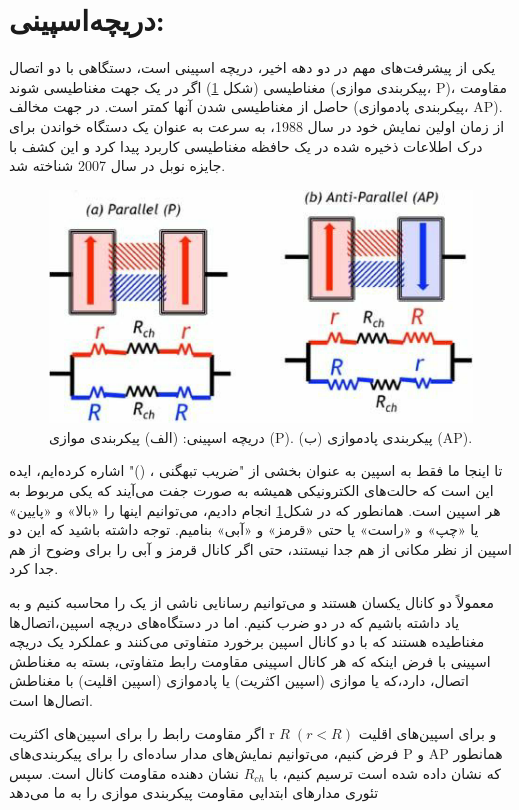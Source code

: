 \section{دریچه‌اسپینی:}
یکی از پیشرفت‌های مهم در دو دهه اخیر، دریچه اسپینی  است، دستگاهی با دو اتصال مغناطیسی (شکل \ref{fig:spinvalve}) اگر در یک جهت مغناطیسی شوند (پیکربندی موازی، \gls{P})، مقاومت حاصل از مغناطیسی شدن آنها کمتر است. در جهت مخالف (پیکربندی پاد‌موازی، \gls{AP}). از زمان اولین نمایش خود در سال 1988، به سرعت به عنوان یک دستگاه خواندن برای درک اطلاعات ذخیره شده در یک حافظه مغناطیسی کاربرد پیدا کرد و این کشف با جایزه نوبل در سال 2007 شناخته شد.
\begin{figure}[!ht]
  \includegraphics[width=1\linewidth]{./figures/spinvalve.png}
  \caption{دریچه اسپینی: (الف) پیکربندی موازی (P). (ب) پیکربندی پاد‌موازی (AP).}
  \label{fig:spinvalve}
\end{figure}
تا اینجا ما فقط به اسپین به عنوان بخشی از "ضریب تبهگنی ، ()" اشاره کرده‌ایم، ایده این است که حالت‌های الکترونیکی همیشه به صورت جفت ‌می‌‌آیند که یکی مربوط به هر اسپین است. همانطور که در شکل\ref{fig:spinvalve} انجام دادیم، ‌می‌‌توانیم اینها را «بالا» و «پایین» یا «چپ» و «راست» یا حتی «قرمز» و «آبی» بنا‌میم. توجه داشته باشید که این دو اسپین از نظر مکانی از هم جدا نیستند، حتی اگر کانال قرمز و آبی را برای وضوح از هم جدا کرد.

معمولاً دو کانال یکسان هستند و ‌‌می‌‌توانیم رسانایی ناشی از یک را محاسبه کنیم و به یاد داشته باشیم که در دو ضرب کنیم. اما در دستگاه‌های دریچه اسپین،اتصال‌ها مغناطیده هستند که با دو کانال اسپین برخورد متفاوتی ‌می‌‌کنند و عملکرد یک دریچه اسپینی با فرض اینکه که هر کانال اسپینی مقاومت رابط  متفاوتی، بسته به مغناطش اتصال، دارد،که یا موازی (اسپین اکثریت) یا پاد‌موازی (اسپین اقلیت) با مغناطش اتصال‌ها است.

اگر مقاومت رابط را برای اسپین‌های اکثریت r و برای اسپین‌های اقلیت $R \;(r < R)$ فرض کنیم، ‌‌می‌‌توانیم نمایش‌های مدار ساده‌ای را برای پیکربندی‌های \gls{P} و \gls{AP} همانطور که نشان داده شده است ترسیم کنیم، با $R_{ch}$ نشان دهنده مقاومت کانال است. سپس تئوری مدارهای ابتدایی مقاومت پیکربندی موازی را به ما ‌‌می‌‌دهد

